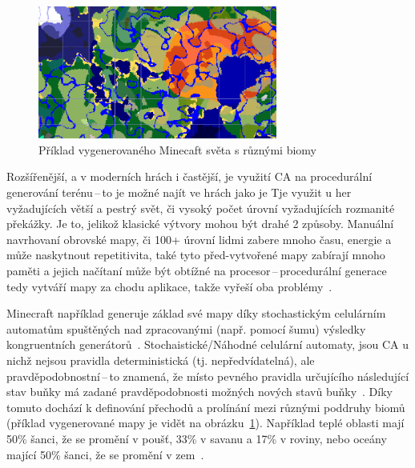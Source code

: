 \begin{figure}[H]
    \centering
    \includegraphics[width=0.7\textwidth]{obrazky-figures/ch2/minecraft_biom.png}
    \caption{Příklad vygenerovaného Minecaft světa s různými biomy}
    \label{fig:minecraft_biom}
\end{figure}

Rozšířenější, a v moderních hrách i častější, je využití CA na procedurální generování terénu\,--\,to je možné najít ve hrách jako je Tje využit u her vyžadujících větší a pestrý svět, či vysoký počet úrovní vyžadujících rozmanité překážky. Je to, jelikož klasické  výtvory mohou být drahé 2 způsoby. Manuální navrhovaní obrovské mapy, či 100+ úrovní lidmi zabere mnoho času, energie a může naskytnout repetitivita, také tyto před-vytvořené mapy zabírají mnoho paměti a jejich načítaní může být obtížné na procesor\,--\,procedurální generace tedy vytváří mapy za chodu aplikace, takže vyřeší oba problémy~\cite{Procedural_Game_Map}.

Minecraft například generuje základ své mapy díky stochastickým celulárním automatům spuštěných nad zpracovanými (např. pomocí šumu) výsledky kongruentních generátorů~\cite{Minecraft}. Stochaistické/Náhodné celulární automaty, jsou CA u nichž nejsou pravidla deterministická (tj. nepředvídatelná), ale pravděpodobnostní\,--\,to znamená, že místo pevného pravidla určujícího následující stav buňky má zadané pravděpodobnosti možných nových stavů buňky~\cite{DBLP:journals/corr/abs-1304-7185}. Díky tomuto dochází k definování přechodů a prolínání mezi různými poddruhy biomů (příklad vygenerované mapy je vidět na obrázku~\ref{fig:minecraft_biom}). Například teplé oblasti mají 50\% šanci, že se promění v poušť, 33\% v savanu a 17\% v roviny, nebo oceány mající 50\% šanci, že se promění v zem~\cite{Minecraft}.

